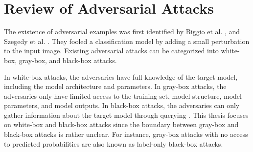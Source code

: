 





\section{Review of Adversarial Attacks}
\label{sec:adv_attack}

The existence of adversarial examples was first identified by Biggio et al. \citep{biggio2013evasion}, and Szegedy et al. \citep{szegedy2013intriguing}. They fooled a classification model by adding a small perturbation to the input image. Existing adversarial attacks can be categorized into white-box, gray-box, and black-box attacks. 

In white-box attacks, the adversaries have full knowledge of the target model, including the model architecture and parameters. In gray-box attacks, the adversaries only have limited access to the training set, model structure, model parameters, and model outputs. In black-box attacks, the adversaries can only gather information about the target model through querying \citep{REN2020346}. This thesis focuses on white-box and black-box attacks since the boundary between gray-box and black-box attacks is rather unclear. For instance, gray-box attacks with no access to predicted probabilities are also known as label-only black-box attacks.


